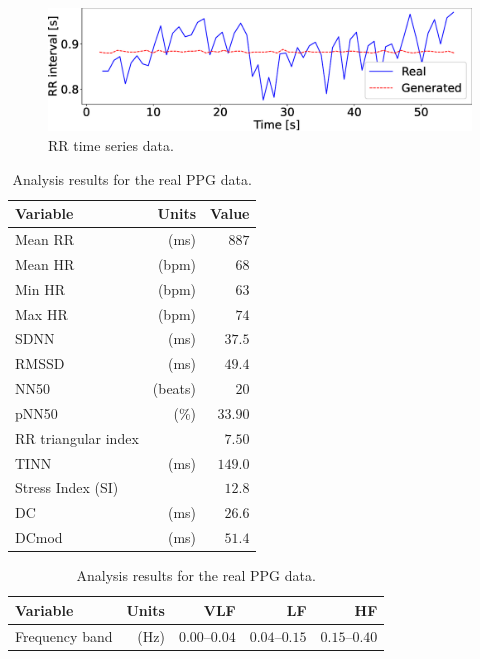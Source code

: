 \begin{figure}[!t]
  \centering
  \includegraphics[width=1\linewidth]{figures/rr_wave.eps}
  \caption{RR time series data.}
  \label{fig:rr_wave}
\end{figure}

\begin{table}[!t]
  \centering
  \caption{Analysis results for the real PPG data.}
  \begin{minipage}[t]{1\linewidth}
    \centering
    \begin{tabular}{lrr}
    \toprule
    Variable & Units & Value \\
    \midrule
    Mean RR & (ms) & $887$ \\
    Mean HR & (bpm) & $68$ \\
    Min HR & (bpm) & $63$ \\
    Max HR & (bpm) & $74$ \\
    SDNN & (ms) & $37.5$ \\
    RMSSD & (ms) & $49.4$ \\
    NN50 & (beats) & $20$ \\
    pNN50 & (\%) & $33.90$ \\
    RR triangular index & & $7.50$ \\
    TINN & (ms) & $149.0$ \\
    Stress Index (SI) & & $12.8$ \\
    DC & (ms) & $26.6$ \\
    DCmod & (ms) & $51.4$ \\
    \bottomrule
    \end{tabular}
    \vspace{10pt}
  \end{minipage}
  \begin{minipage}[t]{1\linewidth}
    \centering
    \begin{tabular}{lrrrr}
    \toprule
    Variable & Units & VLF & LF & HF \\
    \midrule
    Frequency band & (Hz) & $0.00\text{--}0.04$ & $0.04\text{--}0.15$ & $0.15\text{--}0.40$ \\

\end{tabular}
\end{minipage}
\end{table}
